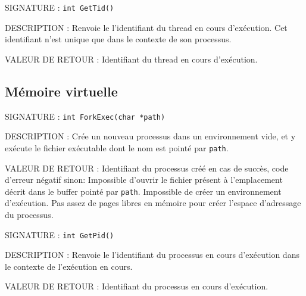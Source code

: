 \documentclass{article}
\begin{document}
		\vspace{2.5mm}
		\begin{description}
			\item{SIGNATURE : } \texttt{int GetTid()}
			\item{DESCRIPTION : Renvoie le l'identifiant du thread en cours d'exécution. Cet identifiant n'est unique que dans le contexte de son processus.} 
			\item{VALEUR DE RETOUR : } Identifiant du thread en cours d'exécution.
		\end{description}
	\subsection{Mémoire virtuelle}
		\begin{description}
			\item{SIGNATURE : } \texttt{int ForkExec(char *path)}
			\item{DESCRIPTION : } Crée un nouveau processus dans un environnement vide, et y exécute le fichier exécutable dont le nom est pointé par \texttt{path}.
			\item{VALEUR DE RETOUR : } Identifiant du processus créé en cas de succès, code d'erreur négatif sinon:
				 Impossible d'ouvrir le fichier présent à l'emplacement décrit dans le buffer pointé par \texttt{path}.
				 Impossible de créer un environnement d'exécution.
				 Pas assez de pages libres en mémoire pour créer l'espace d'adressage du processus.
		\end{description}
		\vspace{2.5mm}
		\begin{description}
			\item{SIGNATURE : } \texttt{int GetPid()}
			\item{DESCRIPTION : } Renvoie le l'identifiant du processus en cours d'exécution dans le contexte de l'exécution en cours.
			\item{VALEUR DE RETOUR : } Identifiant du processus en cours d'exécution.
		\end{description}
		
\end{document}
